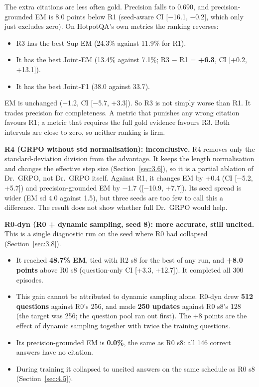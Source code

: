 The extra citations are less often gold. Precision falls to 0.690, and
precision-grounded EM is 8.0 points below R1 (seed-aware CI {[}−16.1,
−0.2{]}, which only just excludes zero). On HotpotQA's own metrics the
ranking reverses:

\begin{itemize}
\tightlist
\item
  R3 has the best Sup-EM (24.3\% against 11.9\% for R1).
\item
  It has the best Joint-EM (13.4\% against 7.1\%; R3 − R1 =
  \textbf{+6.3}, CI {[}+0.2, +13.1{]}).
\item
  It has the best Joint-F1 (38.0 against 33.7).
\end{itemize}

EM is unchanged (−1.2, CI {[}−5.7, +3.3{]}). So R3 is not simply worse
than R1. It trades precision for completeness. A metric that punishes
any wrong citation favours R1; a metric that requires the full gold
evidence favours R3. Both intervals are close to zero, so neither
ranking is firm.

\textbf{R4 (GRPO without std normalisation): inconclusive.} R4 removes
only the standard-deviation division from the advantage. It keeps the
length normalisation and changes the effective step size
(Section~\ref{sec:3.6}), so it is a partial ablation of Dr.~GRPO, not
Dr.~GRPO itself. Against R1, it changes EM by +0.4 (CI {[}−5.2, +5.7{]})
and precision-grounded EM by −1.7 ({[}−10.9, +7.7{]}). Its seed spread
is wider (EM sd 4.0 against 1.5), but three seeds are too few to call
this a difference. The result does not show whether full Dr.~GRPO would
help.

\textbf{R0-dyn (R0 + dynamic sampling, seed 8): more accurate, still
uncited.} This is a single diagnostic run on the seed where R0 had
collapsed (Section~\ref{sec:3.8}).

\begin{itemize}
\tightlist
\item
  It reached \textbf{48.7\% EM}, tied with R2 s8 for the best of any
  run, and \textbf{+8.0 points} above R0 s8 (question-only CI {[}+3.3,
  +12.7{]}). It completed all 300 episodes.
\item
  This gain cannot be attributed to dynamic sampling alone. R0-dyn drew
  \textbf{512 questions} against R0's 256, and made \textbf{250 updates}
  against R0 s8's 128 (the target was 256; the question pool ran out
  first). The +8 points are the effect of dynamic sampling together with
  twice the training questions.
\item
  Its precision-grounded EM is \textbf{0.0\%}, the same as R0 s8: all
  146 correct answers have no citation.
\item
  During training it collapsed to uncited answers on the same schedule
  as R0 s8 (Section~\ref{sec:4.5}).
\end{itemize}

